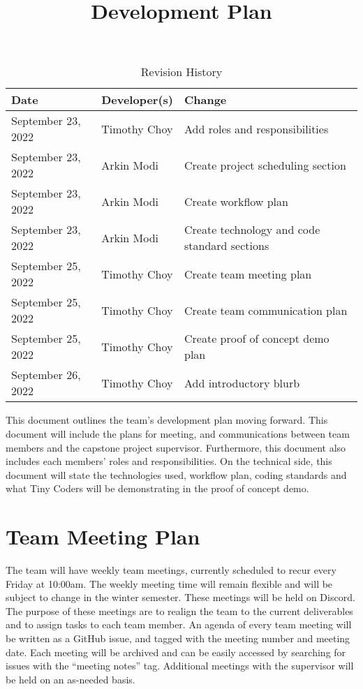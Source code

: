 \documentclass{article}
\title{Development Plan\\\progname}
\author{\authname}
\date{}
\begin{document}
\maketitle

\begin{table}[hp]
	\caption{Revision History} \label{TblRevisionHistory}
	\begin{tabularx}{\textwidth}{llX}
		\toprule
		\textbf{Date}      & \textbf{Developer(s)} & \textbf{Change}                              \\
		\midrule
		September 23, 2022 & Timothy Choy          & Add roles and responsibilities               \\
		September 23, 2022 & Arkin Modi            & Create project scheduling section            \\
		September 23, 2022 & Arkin Modi            & Create workflow plan                         \\
		September 23, 2022 & Arkin Modi            & Create technology and code standard sections \\
		September 25, 2022 & Timothy Choy          & Create team meeting plan                     \\
		September 25, 2022 & Timothy Choy          & Create team communication plan               \\
		September 25, 2022 & Timothy Choy          & Create proof of concept demo plan            \\
		September 26, 2022 & Timothy Choy          & Add introductory blurb                       \\
		\bottomrule
	\end{tabularx}
\end{table}


This document outlines the team's development plan moving forward. This document will include the
plans for meeting, and communications between team members and the capstone project supervisor.
Furthermore, this document also includes each members' roles and responsibilities. On the technical
side, this document will state the technologies used, workflow plan, coding standards and what Tiny
Coders will be demonstrating in the proof of concept demo.

\section{Team Meeting Plan}

The team will have weekly team meetings, currently scheduled to recur every Friday at 10:00am. The
weekly meeting time will remain flexible and will be subject to change in the winter semester.
These meetings will be held on Discord. The purpose of these meetings are to realign the team to
the current deliverables and to assign tasks to each team member. An agenda of every team meeting
will be written as a GitHub issue, and tagged with the meeting number and meeting date. Each
meeting will be archived and can be easily accessed by searching for issues with the ``meeting
notes'' tag. Additional meetings with the supervisor will be held on an as-needed basis.
\end{document}
